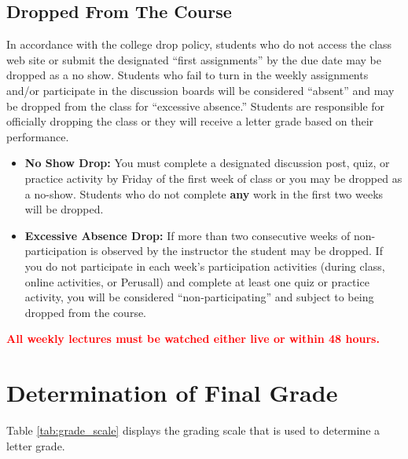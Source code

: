 \documentclass[11pt,]{article}
\begin{document}
\hypertarget{dropped-from-the-course}{%
\subsection{Dropped From The Course}\label{dropped-from-the-course}}

In accordance with the college drop policy, students who do not access
the class web site or submit the designated ``first assignments'' by the
due date may be dropped as a no show. Students who fail to turn in the
weekly assignments and/or participate in the discussion boards will be
considered ``absent'' and may be dropped from the class for ``excessive
absence.'' Students are responsible for officially dropping the class or
they will receive a letter grade based on their performance.

\begin{itemize}
\item
  \textbf{No Show Drop:} You must complete a designated discussion post,
  quiz, or practice activity by Friday of the first week of class or you
  may be dropped as a no-show. Students who do not complete \textbf{any}
  work in the first two weeks will be dropped.
\item
  \textbf{Excessive Absence Drop:} If more than two consecutive weeks of
  non-participation is observed by the instructor the student may be
  dropped. If you do not participate in each week's participation
  activities (during class, online activities, or Perusall) and complete
  at least one quiz or practice activity, you will be considered
  ``non-participating'' and subject to being dropped from the course.
\end{itemize}

\textcolor{red}{\bf{All weekly lectures must be watched either live or within 48 hours.}}

\hypertarget{determination-of-final-grade}{%
\section{Determination of Final
Grade}\label{determination-of-final-grade}}

Table \ref{tab:grade_scale} displays the grading scale that is used to
determine a letter grade.

\renewcommand{\arraystretch}{1.5}
\end{document}
